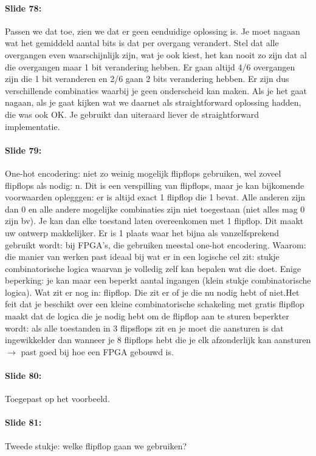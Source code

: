 \documentclass[10pt,a4paper]{book}
\begin{document}
\paragraph{Slide 78:} Passen we dat toe, zien we dat er geen eenduidige oplossing is. Je moet nagaan wat het gemiddeld aantal bits is dat per overgang verandert. Stel dat alle overgangen even waarschijnlijk zijn, wat je ook kiest, het kan nooit zo zijn dat al die overgangen maar 1 bit verandering hebben. Er gaan altijd 4/6 overgangen zijn die 1 bit veranderen en 2/6 gaan 2 bits verandering hebben. Er zijn dus verschillende combinaties waarbij je geen onderscheid kan maken. Als je het gaat nagaan, als je gaat kijken wat we daarnet als straightforward oplossing hadden, die was ook OK. Je gebruikt dan uiteraard liever de straightforward implementatie. 

\paragraph{Slide 79:} One-hot encodering: niet zo weinig mogelijk flipflops gebruiken, wel zoveel flipflops als nodig: n. Dit is een verspilling van flipflops, maar je kan bijkomende voorwaarden oplegggen: er is altijd exact 1 flipflop die 1 bevat. Alle anderen zijn dan 0 en alle andere mogelijke combinaties zijn niet toegestaan (niet alles mag 0 zijn bv). Je kan dan elke toestand laten overeenkomen met 1 flipflop. Dit maakt uw ontwerp makkelijker. Er is 1 plaats waar het bijna als vanzelfsprekend gebruikt wordt: bij FPGA's, die gebruiken meestal one-hot encodering. Waarom: die manier van werken past ideaal bij wat er in een logische cel zit: stukje combinatorische logica waarvan je volledig zelf kan bepalen wat die doet. Enige beperking: je kan maar een beperkt aantal ingangen (klein stukje combinatorische logica). Wat zit er nog in: flipflop. Die zit er of je die nu nodig hebt of niet.Het feit dat je beschikt over een kleine combinatorische schakeling met gratis flipflop maakt dat de logica die je nodig hebt om de flipflop aan te sturen beperkter wordt: als alle toestanden in 3 flipsflops zit en je moet die aansturen is dat ingewikkelder dan wanneer je 8 flipflops hebt die je elk afzonderlijk kan aansturen $\rightarrow$ past goed bij hoe een FPGA gebouwd is. 

\paragraph{Slide 80:} Toegepast op het voorbeeld.

\paragraph{Slide 81:} Tweede stukje: welke flipflop gaan we gebruiken?
\end{document}
